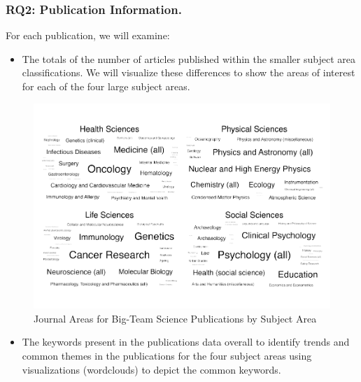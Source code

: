 \documentclass[
  man]{apa7}
\providecommand{\tightlist}{%
  \setlength{\itemsep}{0pt}\setlength{\parskip}{0pt}}
\begin{document}
\hypertarget{rq2-publication-information.-1}{%
\subsubsection{RQ2: Publication Information.}\label{rq2-publication-information.-1}}

For each publication, we will examine:

\begin{itemize}
\tightlist
\item
  The totals of the number of articles published within the smaller
  subject area classifications. We will visualize these differences to show the areas of interest for each of the four large subject areas.
\end{itemize}

\begin{figure}
\centering
\includegraphics{manuscript_scopus_files/figure-latex/fig-clouds-1.pdf}
\caption{\label{fig:fig-clouds}Journal Areas for Big-Team Science Publications by Subject Area}
\end{figure}

\begin{itemize}
\tightlist
\item
  The keywords present in the publications data overall to identify
  trends and common themes in the publications for the four subject
  areas using visualizations (wordclouds) to depict the common
  keywords.
\end{itemize}
\end{document}
